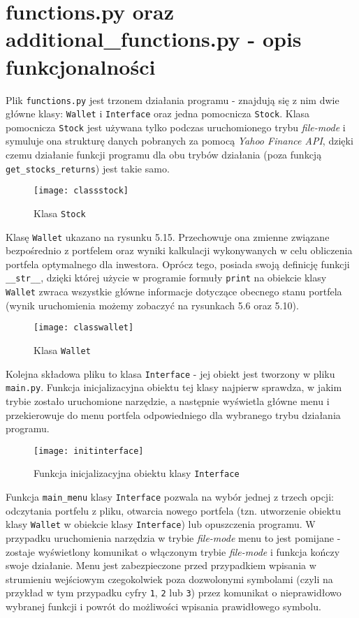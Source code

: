 \documentclass[magister]{dyplom}
\def\code#1{\texttt{#1}}
\begin{document}
\section{functions.py oraz additional\_functions.py - opis funkcjonalności}

Plik \code{functions.py} jest trzonem działania programu - znajdują się z nim dwie główne klasy: \code{Wallet} i \code{Interface} oraz jedna pomocnicza \code{Stock}.
Klasa pomocnicza \code{Stock} jest używana tylko podczas uruchomionego trybu \textit{file-mode} i symuluje ona strukturę danych pobranych za pomocą \textit{Yahoo Finance API}, dzięki czemu działanie funkcji programu dla obu trybów działania (poza funkcją \code{get\_stocks\_returns}) jest takie samo.
\begin{figure}[ht]
	\centering
	\texttt{[image: classstock]}
	\caption{Klasa \code{Stock}}
\end{figure}

Klasę \code{Wallet} ukazano na rysunku 5.15. Przechowuje ona zmienne związane bezpośrednio z portfelem oraz wyniki kalkulacji wykonywanych w celu obliczenia portfela optymalnego dla inwestora. Oprócz tego, posiada swoją definicję funkcji \code{\_\_str\_\_}, dzięki której użycie w programie formuły \code{print} na obiekcie klasy \code{Wallet} zwraca wszystkie główne informacje dotyczące obecnego stanu portfela (wynik uruchomienia możemy zobaczyć na rysunkach 5.6 oraz 5.10).
\newpage
\begin{figure}[ht]
	\centering
	\texttt{[image: classwallet]}
	\caption{Klasa \code{Wallet}}
\end{figure}

Kolejna składowa pliku to klasa \code{Interface} - jej obiekt jest tworzony w pliku \code{main.py}. Funkcja inicjalizacyjna obiektu tej klasy najpierw sprawdza, w jakim trybie zostało uruchomione narzędzie, a następnie wyświetla główne menu i przekierowuje do menu portfela odpowiedniego dla wybranego trybu działania programu.

\begin{figure}[ht]
	\centering
	\texttt{[image: initinterface]}
	\caption{Funkcja inicjalizacyjna obiektu klasy \code{Interface}}
\end{figure}

Funkcja \code{main\_menu} klasy \code{Interface} pozwala na wybór jednej z trzech opcji: odczytania portfelu z pliku, otwarcia nowego portfela (tzn. utworzenie obiektu klasy \code{Wallet} w obiekcie klasy \code{Interface}) lub opuszczenia programu. W przypadku uruchomienia narzędzia w trybie \textit{file-mode} menu to jest pomijane - zostaje wyświetlony komunikat o włączonym trybie \textit{file-mode} i funkcja kończy swoje działanie. Menu jest zabezpieczone przed przypadkiem wpisania w strumieniu wejściowym czegokolwiek poza dozwolonymi symbolami (czyli na przykład w tym przypadku cyfry \code{1}, \code{2} lub \code{3}) przez komunikat o nieprawidłowo wybranej funkcji i powrót do możliwości wpisania prawidłowego symbolu.
\end{document}

